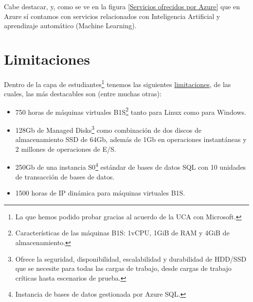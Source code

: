 Cabe destacar, y, como se ve en la figura \ref{Servicios ofrecidos por Azure} que en Azure sí contamos con servicios relacionados con Inteligencia Artificial y aprendizaje automático (Machine Learning).

\section{Limitaciones}
Dentro de la capa de estudiantes\footnote{La que hemos podido probar gracias al acuerdo de la UCA con Microsoft.} tenemos las siguientes \href{https://azure.microsoft.com/es-es/free/free-account-students-faq/}{limitaciones}, de las cuales, las más destacables son (entre muchas otras):
\begin{itemize}
	\item 750 horas de máquinas virtuales B1S\footnote{Características de las máquinas B1S: 1vCPU, 1GiB de RAM y 4GiB de almacenamiento.} tanto para Linux como para Windows.
	\item 128Gb de Managed Disks\footnote{Ofrece la seguridad, disponibilidad, escalabilidad y durabilidad de HDD/SSD que se necesite para todas las cargas de trabajo, desde cargas de trabajo críticas hasta escenarios de prueba.} como combinación de dos discos de almacenamiento SSD de 64Gb, además de 1Gb en operaciones instantáneas y 2 millones de operaciones de E/S.
	\item 250Gb de una instancia S0\footnote{Instancia de bases de datos gestionada por Azure SQL.} estándar de bases de datos SQL con 10 unidades de transacción de bases de datos.
	\item 1500 horas de IP dinámica para máquinas virtuales B1S.
\end{itemize}